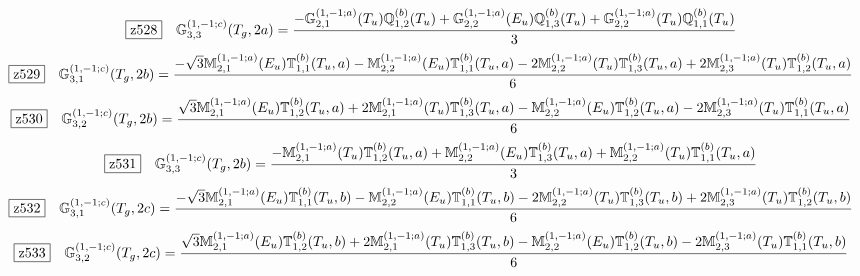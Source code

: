\documentclass[fleqn,10pt,landscape]{jsarticle}
\begin{document}
\begin{dmath*}
\hspace*{3mm}\fbox{z528}\quad \mathbb{G}_{3,3}^{(1,-1;c)}(T_{g},2a)=\frac{- \mathbb{G}_{2,1}^{(1,-1;a)}(T_{u}) \mathbb{Q}_{1,2}^{(b)}(T_{u}) + \mathbb{G}_{2,2}^{(1,-1;a)}(E_{u}) \mathbb{Q}_{1,3}^{(b)}(T_{u}) + \mathbb{G}_{2,2}^{(1,-1;a)}(T_{u}) \mathbb{Q}_{1,1}^{(b)}(T_{u})}{3}
\end{dmath*}
\begin{dmath*}
\hspace*{3mm}\fbox{z529}\quad \mathbb{G}_{3,1}^{(1,-1;c)}(T_{g},2b)=\frac{- \sqrt{3} \mathbb{M}_{2,1}^{(1,-1;a)}(E_{u}) \mathbb{T}_{1,1}^{(b)}(T_{u},a) - \mathbb{M}_{2,2}^{(1,-1;a)}(E_{u}) \mathbb{T}_{1,1}^{(b)}(T_{u},a) - 2 \mathbb{M}_{2,2}^{(1,-1;a)}(T_{u}) \mathbb{T}_{1,3}^{(b)}(T_{u},a) + 2 \mathbb{M}_{2,3}^{(1,-1;a)}(T_{u}) \mathbb{T}_{1,2}^{(b)}(T_{u},a)}{6}
\end{dmath*}
\begin{dmath*}
\hspace*{3mm}\fbox{z530}\quad \mathbb{G}_{3,2}^{(1,-1;c)}(T_{g},2b)=\frac{\sqrt{3} \mathbb{M}_{2,1}^{(1,-1;a)}(E_{u}) \mathbb{T}_{1,2}^{(b)}(T_{u},a) + 2 \mathbb{M}_{2,1}^{(1,-1;a)}(T_{u}) \mathbb{T}_{1,3}^{(b)}(T_{u},a) - \mathbb{M}_{2,2}^{(1,-1;a)}(E_{u}) \mathbb{T}_{1,2}^{(b)}(T_{u},a) - 2 \mathbb{M}_{2,3}^{(1,-1;a)}(T_{u}) \mathbb{T}_{1,1}^{(b)}(T_{u},a)}{6}
\end{dmath*}
\begin{dmath*}
\hspace*{3mm}\fbox{z531}\quad \mathbb{G}_{3,3}^{(1,-1;c)}(T_{g},2b)=\frac{- \mathbb{M}_{2,1}^{(1,-1;a)}(T_{u}) \mathbb{T}_{1,2}^{(b)}(T_{u},a) + \mathbb{M}_{2,2}^{(1,-1;a)}(E_{u}) \mathbb{T}_{1,3}^{(b)}(T_{u},a) + \mathbb{M}_{2,2}^{(1,-1;a)}(T_{u}) \mathbb{T}_{1,1}^{(b)}(T_{u},a)}{3}
\end{dmath*}
\begin{dmath*}
\hspace*{3mm}\fbox{z532}\quad \mathbb{G}_{3,1}^{(1,-1;c)}(T_{g},2c)=\frac{- \sqrt{3} \mathbb{M}_{2,1}^{(1,-1;a)}(E_{u}) \mathbb{T}_{1,1}^{(b)}(T_{u},b) - \mathbb{M}_{2,2}^{(1,-1;a)}(E_{u}) \mathbb{T}_{1,1}^{(b)}(T_{u},b) - 2 \mathbb{M}_{2,2}^{(1,-1;a)}(T_{u}) \mathbb{T}_{1,3}^{(b)}(T_{u},b) + 2 \mathbb{M}_{2,3}^{(1,-1;a)}(T_{u}) \mathbb{T}_{1,2}^{(b)}(T_{u},b)}{6}
\end{dmath*}
\begin{dmath*}
\hspace*{3mm}\fbox{z533}\quad \mathbb{G}_{3,2}^{(1,-1;c)}(T_{g},2c)=\frac{\sqrt{3} \mathbb{M}_{2,1}^{(1,-1;a)}(E_{u}) \mathbb{T}_{1,2}^{(b)}(T_{u},b) + 2 \mathbb{M}_{2,1}^{(1,-1;a)}(T_{u}) \mathbb{T}_{1,3}^{(b)}(T_{u},b) - \mathbb{M}_{2,2}^{(1,-1;a)}(E_{u}) \mathbb{T}_{1,2}^{(b)}(T_{u},b) - 2 \mathbb{M}_{2,3}^{(1,-1;a)}(T_{u}) \mathbb{T}_{1,1}^{(b)}(T_{u},b)}{6}
\end{dmath*}
\end{document}
